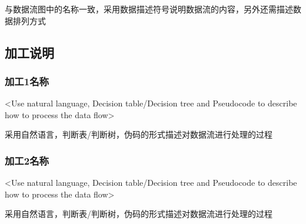与数据流图中的名称一致，采用数据描述符号说明数据流的内容，另外还需描述数据排列方式

\subsection{加工说明}
\subsubsection{加工1名称}
<Use natural language, Decision table/Decision tree and Pseudocode to describe how to process the data flow>

采用自然语言，判断表/判断树，伪码的形式描述对数据流进行处理的过程

\subsubsection{加工2名称}
<Use natural language, Decision table/Decision tree and Pseudocode to describe how to process the data flow>

采用自然语言，判断表/判断树，伪码的形式描述对数据流进行处理的过程
